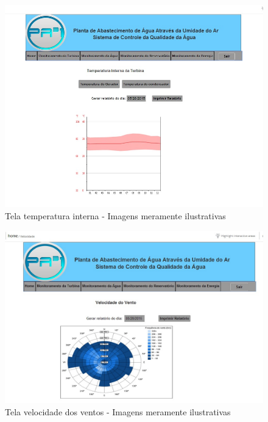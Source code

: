 \begin{center}
\begin{figure}[!ht]
\centering
\includegraphics[scale=0.7]{figuras/1}
\caption[Tela temperatura interna]{Tela temperatura interna - Imagens meramente ilustrativas}
\label{tela_temperatura_interna}
\end{figure}
\clearpage

\begin{figure}[!ht]
\centering
\includegraphics[scale=0.5]{figuras/3}
\caption[Tela velocidade dos ventos]{Tela velocidade dos ventos - Imagens meramente ilustrativas}
\label{tela_velocidade_dos_ventos}
\end{figure}



\end{center}
